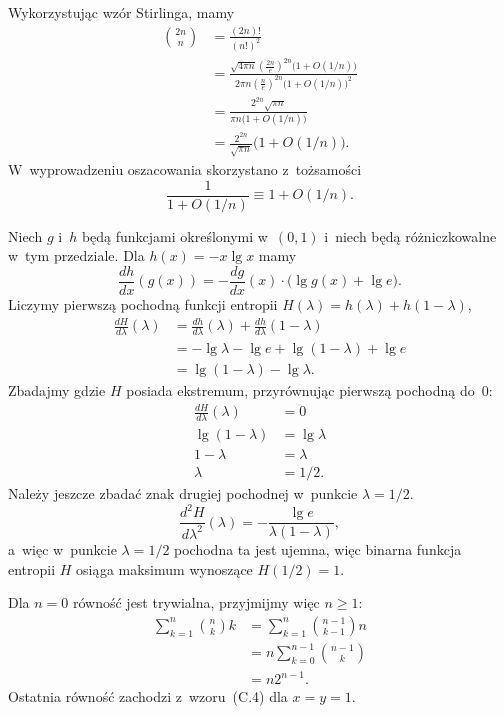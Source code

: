 \exercise{} %
Wykorzystując wzór Stirlinga, mamy
\begin{align*}
	\binom{2n}{n} &= \frac{(2n)!}{(n!)^2} \\
	&= \frac{\sqrt{4\pi n}\left(\frac{2n}{e}\right)^{2n}\bigl(1+O(1/n)\bigr)}{2\pi n\left(\frac{n}{e}\right)^{2n}\bigl(1+O(1/n)\bigr)^2} \\[1mm]
	&= \frac{2^{2n}\sqrt{\pi n}}{\pi n\bigl(1+O(1/n)\bigr)} \\[1mm]
	&= \frac{2^{2n}}{\sqrt{\pi n}}\bigl(1+O(1/n)\bigr).
\end{align*}
W~wyprowadzeniu oszacowania skorzystano z~tożsamości
\[
	\frac{1}{1+O(1/n)} \equiv 1+O(1/n)\bigr.
\]

\exercise{} %
Niech $g$ i~$h$ będą funkcjami określonymi w~$(0,1)$ i~niech będą różniczkowalne w~tym przedziale. Dla $h(x)=-x\lg x$ mamy
\[
	\frac{dh}{dx}(g(x)) = -\frac{dg}{dx}(x)\cdot\bigl(\lg g(x)+\lg e\bigr).
\]
Liczymy pierwszą pochodną funkcji entropii $H(\lambda)=h(\lambda)+h(1-\lambda)$,
\begin{align*}
	\frac{dH}{d\lambda}(\lambda) &= \frac{dh}{d\lambda}(\lambda)+\frac{dh}{d\lambda}(1-\lambda) \\
	&= -\lg\lambda-\lg e+\lg(1-\lambda)+\lg e \\
	&= \lg(1-\lambda)-\lg\lambda.
\end{align*}
Zbadajmy gdzie $H$ posiada ekstremum, przyrównując pierwszą pochodną do~0:
\begin{align*}
	\frac{dH}{d\lambda}(\lambda) &= 0 \\
	\lg(1-\lambda) &= \lg\lambda \\
	1-\lambda &= \lambda \\
	\lambda &= 1/2.
\end{align*}
Należy jeszcze zbadać znak drugiej pochodnej w~punkcie $\lambda=1/2$.
\[
	\frac{d^2\!H}{d\lambda^2}(\lambda) = -\frac{\lg e}{\lambda(1-\lambda)},
\]
a~więc w~punkcie $\lambda=1/2$ pochodna ta jest ujemna, więc binarna funkcja entropii $H$ osiąga maksimum wynoszące $H(1/2)=1$.

\exercise{} %
Dla $n=0$ równość jest trywialna, przyjmijmy więc $n\ge1$:
\begin{align*}
	\sum_{k=1}^n\binom{n}{k}k &= \sum_{k=1}^n\binom{n-1}{k-1}n \\
	&= n\sum_{k=0}^{n-1}\binom{n-1}{k} \\
	&= n2^{n-1}.
\end{align*}
Ostatnia równość zachodzi z~wzoru~(C.4) dla $x=y=1$.

